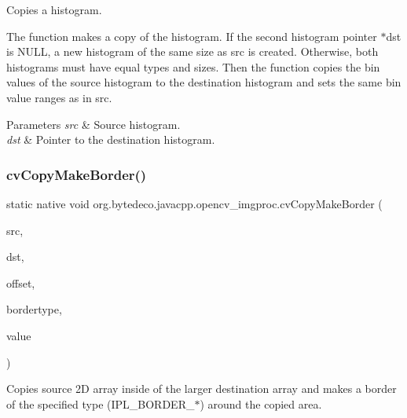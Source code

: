Copies a histogram. 

The function makes a copy of the histogram. If the second histogram pointer $\ast$dst is N\+U\+LL, a new histogram of the same size as src is created. Otherwise, both histograms must have equal types and sizes. Then the function copies the bin values of the source histogram to the destination histogram and sets the same bin value ranges as in src. 


\begin{DoxyParams}{Parameters}
{\em src} & Source histogram. \\
\hline
{\em dst} & Pointer to the destination histogram. \\
\hline
\end{DoxyParams}
\mbox{\label{group__imgproc__c_ga46ab19adc04378f8728b90f45240f5da}} 
\subsubsection{\texorpdfstring{cv\+Copy\+Make\+Border()}{cvCopyMakeBorder()}}
{\footnotesize\ttfamily static native void org.\+bytedeco.\+javacpp.\+opencv\+\_\+imgproc.\+cv\+Copy\+Make\+Border (\begin{DoxyParamCaption}\item[{@Const Cv\+Arr}]{src,  }\item[{Cv\+Arr}]{dst,  }\item[{@By\+Val Cv\+Point}]{offset,  }\item[{int}]{bordertype,  }\item[{@By\+Val(null\+Value=\char`\"{}Cv\+Scalar(cv\+Scalar\+All(0))\char`\"{}) Cv\+Scalar}]{value }\end{DoxyParamCaption})\hspace{0.3cm}{\ttfamily [static]}}

Copies source 2D array inside of the larger destination array and makes a border of the specified type (I\+P\+L\+\_\+\+B\+O\+R\+D\+E\+R\+\_\+$\ast$) around the copied area. \mbox{\label{group__imgproc__c_gac7c346a2a54d8136a2e572578f029e62}} 
